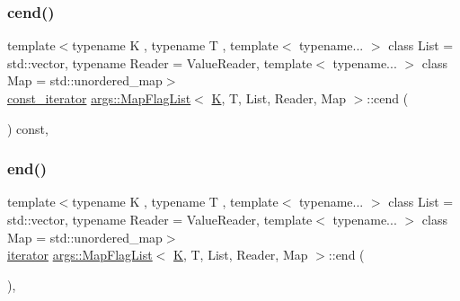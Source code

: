 \mbox{\label{classargs_1_1_map_flag_list_a565f9a371dc12dcdb4665057cf465709}} 
\subsubsection{\texorpdfstring{cend()}{cend()}}
{\footnotesize\ttfamily template$<$typename K , typename T , template$<$ typename... $>$ class List = std\+::vector, typename Reader  = Value\+Reader, template$<$ typename... $>$ class Map = std\+::unordered\+\_\+map$>$ \\
\hyperlink{classargs_1_1_map_flag_list_a6b59eb2e45bf0e576d01b902f3c7a0d7}{const\+\_\+iterator} \hyperlink{classargs_1_1_map_flag_list}{args\+::\+Map\+Flag\+List}$<$ \hyperlink{cgal__test_8cpp_a891e241aa245ae63618f03737efba309}{K}, T, List, Reader, Map $>$\+::cend (\begin{DoxyParamCaption}{ }\end{DoxyParamCaption}) const\hspace{0.3cm}{\ttfamily [inline]}, {\ttfamily [noexcept]}}

\mbox{\label{classargs_1_1_map_flag_list_a53c9c5bf837f5b27b72a599069a87884}} 
\subsubsection{\texorpdfstring{end()}{end()}\hspace{0.1cm}{\footnotesize\ttfamily [1/2]}}
{\footnotesize\ttfamily template$<$typename K , typename T , template$<$ typename... $>$ class List = std\+::vector, typename Reader  = Value\+Reader, template$<$ typename... $>$ class Map = std\+::unordered\+\_\+map$>$ \\
\hyperlink{classargs_1_1_map_flag_list_a73b7f3d1f8e2dc8776c195c9d1b66d34}{iterator} \hyperlink{classargs_1_1_map_flag_list}{args\+::\+Map\+Flag\+List}$<$ \hyperlink{cgal__test_8cpp_a891e241aa245ae63618f03737efba309}{K}, T, List, Reader, Map $>$\+::end (\begin{DoxyParamCaption}{ }\end{DoxyParamCaption})\hspace{0.3cm}{\ttfamily [inline]}, {\ttfamily [noexcept]}}

